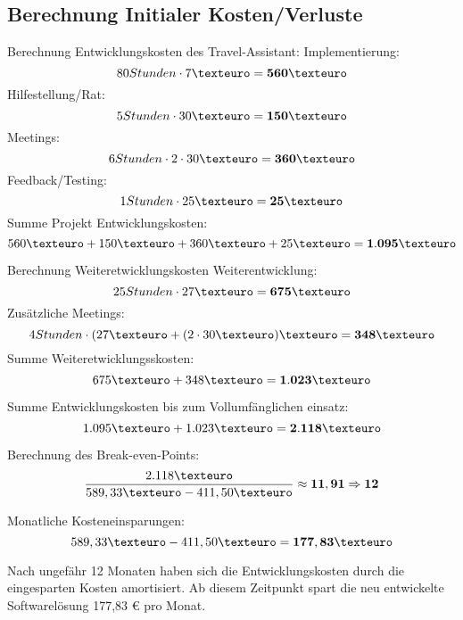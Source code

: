 \subsection{Berechnung Initialer Kosten/Verluste}
Berechnung Entwicklungskosten des Travel-Assistant:
	Implementierung: \[ 80 Stunden \cdot 7€ =  \bf{560€} \]
	Hilfestellung/Rat: \[ 5 Stunden \cdot 30€ =  \bf{150€} \]
	Meetings: \[ 6 Stunden \cdot 2 \cdot 30€ =  \bf{360€} \]
	Feedback/Testing: \[ 1 Stunden \cdot 25€ =  \bf{25€} \]
Summe Projekt Entwicklungskosten: \[560€ + 150€ + 360€ + 25€ =  \bf{1.095€} \]

Berechnung Weiteretwicklungskosten
	Weiterentwicklung: \[ 25 Stunden \cdot 27€ =  \bf{675€} \]
	Zusätzliche Meetings: \[ 4 Stunden \cdot ( 27€ + ( 2 \cdot 30€)€ =  \bf{348€} \]
Summe Weiteretwicklungsskosten: \[675€ + 348€ =  \bf{1.023€} \]

Summe Entwicklungskosten bis zum Vollumfänglichen einsatz: \[1.095€ + 1.023€ =  \bf{2.118€} \]

Berechnung des Break-even-Points: \[ \displaystyle\frac{2.118€}{589,33€ - 411,50€} \approx  \bf{11,91} \Rightarrow 12 \] 

Monatliche Kosteneinsparungen:
\[ 589,33€ - 411,50€ =  \bf{177,83€} \]

Nach ungefähr 12 Monaten haben sich die Entwicklungskosten durch die eingesparten Kosten amortisiert. Ab diesem Zeitpunkt spart die neu entwickelte Softwarelösung 177,83 € pro Monat.